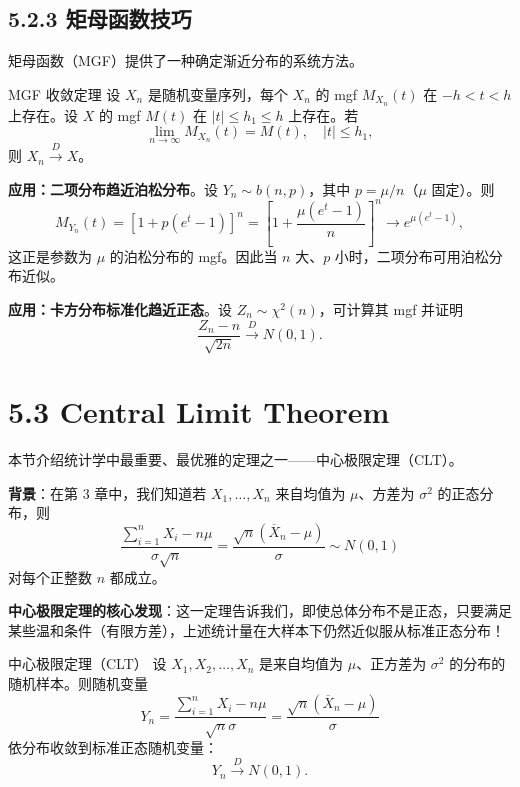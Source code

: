 \subsection{5.2.3 矩母函数技巧}

矩母函数（MGF）提供了一种确定渐近分布的系统方法。

\begin{theorem}{MGF 收敛定理}\label{th:mgf-convergence}
设 ${X_n}$ 是随机变量序列，每个 $X_n$ 的 mgf $M_{X_n}(t)$ 在 $-h < t < h$ 上存在。设 $X$ 的 mgf $M(t)$ 在 $|t| \leq h_1 \leq h$ 上存在。若
\[
\lim_{n \to \infty} M_{X_n}(t) = M(t),\quad |t| \leq h_1,
\]
则 $X_n \xrightarrow{D} X$。
\end{theorem}

\textbf{应用：二项分布趋近泊松分布}。设 $Y_n \sim b(n,p)$，其中 $p = \mu/n$（$\mu$ 固定）。则
\[
M_{Y_n}(t) = [1 + p(e^t - 1)]^n = \left[1 + \frac{\mu(e^t - 1)}{n}\right]^n \to e^{\mu(e^t - 1)},
\]
这正是参数为 $\mu$ 的泊松分布的 mgf。因此当 $n$ 大、$p$ 小时，二项分布可用泊松分布近似。%

\textbf{应用：卡方分布标准化趋近正态}。设 $Z_n \sim \chi^2(n)$，可计算其 mgf 并证明
\[
\frac{Z_n - n}{\sqrt{2n}} \xrightarrow{D} N(0,1).
\label{eq:chi-square-to-normal}
\]

\section{5.3 Central Limit Theorem}\label{sec:5.3}

本节介绍统计学中最重要、最优雅的定理之一——中心极限定理（CLT）。

\textbf{背景}：在第 3 章中，我们知道若 $X_1, \ldots, X_n$ 来自均值为 $\mu$、方差为 $\sigma^2$ 的正态分布，则
\[
\frac{\sum_{i=1}^n X_i - n\mu}{\sigma\sqrt{n}} = \frac{\sqrt{n}(\overline{X}_n - \mu)}{\sigma} \sim N(0,1)
\]
对每个正整数 $n$ 都成立。

\textbf{中心极限定理的核心发现}：这一定理告诉我们，即使总体分布不是正态，只要满足某些温和条件（有限方差），上述统计量在大样本下仍然近似服从标准正态分布！

\begin{theorem}{中心极限定理（CLT）}\label{th:clt}
设 $X_1, X_2, \ldots, X_n$ 是来自均值为 $\mu$、正方差为 $\sigma^2$ 的分布的随机样本。则随机变量
\[
Y_n = \frac{\sum_{i=1}^n X_i - n\mu}{\sqrt{n}\sigma} = \frac{\sqrt{n}(\overline{X}_n - \mu)}{\sigma}
\]
依分布收敛到标准正态随机变量：
\[
Y_n \xrightarrow{D} N(0,1).
\label{eq:clt-statement}
\]
\end{theorem}


